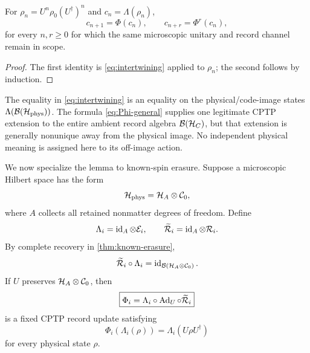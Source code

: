 \begin{corollary}
\label{cor:iterative-record}
For $\rho_n=U^n\rho_0(U^\dagger)^n$ and $c_n=\Lambda(\rho_n)$,
\begin{equation}
  c_{n+1}=\Phi(c_n),
  \qquad
  c_{n+r}=\Phi^r(c_n),
  \label{eq:record-iteration}
\end{equation}
for every $n,r\ge0$ for which the same microscopic unitary and record channel remain in scope.
\end{corollary}

\begin{proof}
The first identity is \cref{eq:intertwining} applied to $\rho_n$; the second follows by induction.
\end{proof}

The equality in \cref{eq:intertwining} is an equality on the physical/code-image states $\Lambda(\mathcal B(\mathcal H_{\mathrm{phys}}))$.  The formula \cref{eq:Phi-general} supplies one legitimate CPTP extension to the entire ambient record algebra $\mathcal B(\mathcal H_C)$, but that extension is generally nonunique away from the physical image.  No independent physical meaning is assigned here to its off-image action.

We now specialize the lemma to known-spin erasure.  Suppose a microscopic Hilbert space has the form
\begin{equation}
  \mathcal H_{\mathrm{phys}}
  =\mathcal H_A\otimes\mathcal C_0,
\end{equation}
where $A$ collects all retained nonmatter degrees of freedom.  Define
\begin{equation}
  \Lambda_i
  =\operatorname{id}_A\otimes\mathcal E_i,
  \qquad
  \widetilde{\mathcal R}_i
  =\operatorname{id}_A\otimes\mathcal R_i.
  \label{eq:extended-erasure-recovery}
\end{equation}
By complete recovery in \cref{thm:known-erasure},
\begin{equation}
  \widetilde{\mathcal R}_i\circ\Lambda_i
  =\operatorname{id}_{\mathcal B(\mathcal H_A\otimes\mathcal C_0)}.
  \label{eq:extended-left-inverse}
\end{equation}
If $U$ preserves $\mathcal H_A\otimes\mathcal C_0$, then
\begin{equation}
  \boxed{
  \Phi_i
  =\Lambda_i\circ\operatorname{Ad}_U\circ\widetilde{\mathcal R}_i
  }
  \label{eq:spin-record-Phi}
\end{equation}
is a fixed CPTP record update satisfying
\begin{equation}
  \Phi_i(\Lambda_i(\rho))
  =\Lambda_i(U\rho U^\dagger)
  \label{eq:spin-record-intertwining}
\end{equation}
for every physical state $\rho$.

